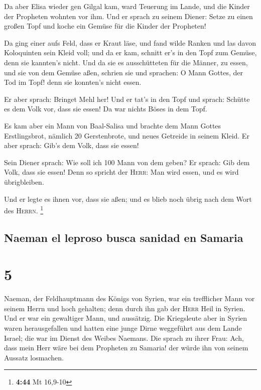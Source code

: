  Da aber Elisa wieder gen Gilgal kam, ward Teuerung im
Lande, und die Kinder der Propheten wohnten vor ihm. Und er sprach zu
seinem Diener: Setze zu einen großen Topf und koche ein Gemüse für die
Kinder der Propheten!

 Da ging einer aufs Feld, dass er Kraut läse, und fand
wilde Ranken und las davon Koloquinten sein Kleid voll; und da er kam,
schnitt er's in den Topf zum Gemüse, denn sie kannten's nicht.
 Und da sie es ausschütteten für die Männer, zu essen,
und sie von dem Gemüse aßen, schrien sie und sprachen: O Mann Gottes,
der Tod im Topf! denn sie konnten's nicht essen.

 Er aber sprach: Bringet Mehl her! Und er tat's in den
Topf und sprach: Schütte es dem Volk vor, dass sie essen! Da war nichts
Böses in dem Topf.

 Es kam aber ein Mann von Baal-Salisa und brachte dem
Mann Gottes Erstlingsbrot, nämlich 20 Gerstenbrote, und neues Getreide
in seinem Kleid. Er aber sprach: Gib's dem Volk, dass sie essen!

 Sein Diener sprach: Wie soll ich 100 Mann von dem geben?
Er sprach: Gib dem Volk, dass sie essen! Denn so spricht der
\textsc{Herr}: Man wird essen, und es wird übrigbleiben.

 Und er legte es ihnen vor, dass sie aßen; und es blieb
noch übrig nach dem Wort des \textsc{Herrn}. \footnote{\textbf{4:44} Mt
  16,9-10}

\hypertarget{naeman-el-leproso-busca-sanidad-en-samaria}{%
\subsection{Naeman el leproso busca sanidad en
Samaria}\label{naeman-el-leproso-busca-sanidad-en-samaria}}

\hypertarget{section-4}{%
\section{5}\label{section-4}}

 Naeman, der Feldhauptmann des Königs von Syrien, war ein
trefflicher Mann vor seinem Herrn und hoch gehalten; denn durch ihn gab
der \textsc{Herr} Heil in Syrien. Und er war ein gewaltiger Mann, und
aussätzig.  Die Kriegsleute aber in Syrien waren
herausgefallen und hatten eine junge Dirne weggeführt aus dem Lande
Israel; die war im Dienst des Weibes Naemans.  Die sprach
zu ihrer Frau: Ach, dass mein Herr wäre bei dem Propheten zu Samaria!
der würde ihn von seinem Aussatz losmachen.

